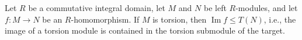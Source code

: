 Let $R$ be a commutative integral domain, let $M$ and $N$ be left $R$-modules, and let $f: M \rightarrow N$ be an $R$-homomorphism. If $M$ is torsion, then $\operatorname{Im} f \leq T(N)$, i.e., the image of a torsion module is contained in the torsion submodule of the target.
